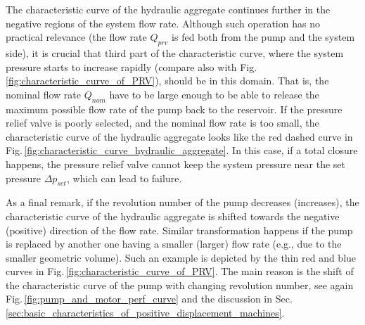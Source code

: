 The characteristic curve of the hydraulic aggregate continues further in the negative regions of the system flow rate. Although such operation has no practical relevance (the flow rate $Q_{prv}$ is fed both from the pump and the system side), it is crucial that third part of the characteristic curve, where the system pressure starts to increase rapidly (compare also with Fig.\,\ref{fig:characteristic_curve_of_PRV}), should be in this domain. That is, the nominal flow rate $Q_{nom}$ have to be large enough to be able to release the maximum possible flow rate of the pump back to the reservoir. If the pressure relief valve is poorly selected, and the nominal flow rate is too small, the characteristic curve of the hydraulic aggregate looks like the red dashed curve in Fig.\,\ref{fig:characteristic_curve_hydraulic_aggregate}. In this case, if a total closure happens, the pressure relief valve cannot keep the system pressure near the set pressure $\Delta p_{set}$, which can lead to failure.

As a final remark, if the revolution number of the pump decreases (increases), the characteristic curve of the hydraulic aggregate is shifted towards the negative (positive) direction of the flow rate. Similar transformation happens if the pump is replaced by another one having a smaller (larger) flow rate (e.g., due to the smaller geometric volume). Such an example is depicted by the thin red and blue curves in Fig.\,\ref{fig:characteristic_curve_of_PRV}. The main reason is the shift of the characteristic curve of the pump with changing revolution number, see again Fig.\,\ref{fig:pump_and_motor_perf_curve} and the discussion in Sec.\,\ref{sec:basic_characteristics_of_positive_displacement_machines}.

